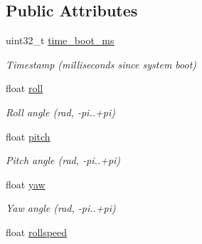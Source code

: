 \subsection*{Public Attributes}
\begin{DoxyCompactItemize}
\item 
\hypertarget{struct____mavlink__attitude__t_a7330cabdd19ca8d3dc27ff1a6b585326}{uint32\+\_\+t \hyperlink{struct____mavlink__attitude__t_a7330cabdd19ca8d3dc27ff1a6b585326}{time\+\_\+boot\+\_\+ms}}\label{struct____mavlink__attitude__t_a7330cabdd19ca8d3dc27ff1a6b585326}

\begin{DoxyCompactList}\small\item\em Timestamp (milliseconds since system boot) \end{DoxyCompactList}\item 
\hypertarget{struct____mavlink__attitude__t_a5ac57ac7109bca27a72d5a4128a8010f}{float \hyperlink{struct____mavlink__attitude__t_a5ac57ac7109bca27a72d5a4128a8010f}{roll}}\label{struct____mavlink__attitude__t_a5ac57ac7109bca27a72d5a4128a8010f}

\begin{DoxyCompactList}\small\item\em Roll angle (rad, -\/pi..+pi) \end{DoxyCompactList}\item 
\hypertarget{struct____mavlink__attitude__t_ad9be17d1bb5941060e7c81634ebec51c}{float \hyperlink{struct____mavlink__attitude__t_ad9be17d1bb5941060e7c81634ebec51c}{pitch}}\label{struct____mavlink__attitude__t_ad9be17d1bb5941060e7c81634ebec51c}

\begin{DoxyCompactList}\small\item\em Pitch angle (rad, -\/pi..+pi) \end{DoxyCompactList}\item 
\hypertarget{struct____mavlink__attitude__t_a24ce486ebd7bde1558ad456684bcbd93}{float \hyperlink{struct____mavlink__attitude__t_a24ce486ebd7bde1558ad456684bcbd93}{yaw}}\label{struct____mavlink__attitude__t_a24ce486ebd7bde1558ad456684bcbd93}

\begin{DoxyCompactList}\small\item\em Yaw angle (rad, -\/pi..+pi) \end{DoxyCompactList}\item 
\hypertarget{struct____mavlink__attitude__t_ae46e19a3dc0bde80d9a0eddbc0f9315d}{float \hyperlink{struct____mavlink__attitude__t_ae46e19a3dc0bde80d9a0eddbc0f9315d}{rollspeed}}\label{struct____mavlink__attitude__t_ae46e19a3dc0bde80d9a0eddbc0f9315d}


\end{DoxyCompactItemize}
